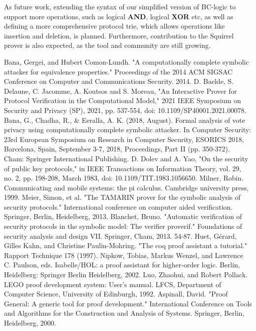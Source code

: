 \documentclass[conference]{IEEEtran}
\begin{document}
As future work, extending the syntax of our simplified version of BC-logic to support more operations, such as logical \textbf{AND}, logical \textbf{XOR} etc, as well as defining a more comprehensive protocol trie, which allows operations like insertion and deletion, is planned. Furthermore, contribution to the Squirrel prover is also expected, as the tool and community are still growing.

\begin{thebibliography}{00}
 Bana, Gergei, and Hubert Comon-Lundh. "A computationally complete symbolic attacker for equivalence properties." Proceedings of the 2014 ACM SIGSAC Conference on Computer and Communications Security. 2014.
 D. Baelde, S. Delaune, C. Jacomme, A. Koutsos and S. Moreau, "An Interactive Prover for Protocol Verification in the Computational Model," 2021 IEEE Symposium on Security and Privacy (SP), 2021, pp. 537-554, doi: 10.1109/SP40001.2021.00078.
 Bana, G., Chadha, R., \& Eeralla, A. K. (2018, August). Formal analysis of vote privacy using computationally complete symbolic attacker. In Computer Security: 23rd European Symposium on Research in Computer Security, ESORICS 2018, Barcelona, Spain, September 3-7, 2018, Proceedings, Part II (pp. 350-372). Cham: Springer International Publishing.
 D. Dolev and A. Yao, "On the security of public key protocols," in IEEE Transactions on Information Theory, vol. 29, no. 2, pp. 198-208, March 1983, doi: 10.1109/TIT.1983.1056650.
 Milner, Robin. Communicating and mobile systems: the pi calculus. Cambridge university press, 1999.
 Meier, Simon, et al. "The TAMARIN prover for the symbolic analysis of security protocols." International conference on computer aided verification. Springer, Berlin, Heidelberg, 2013.
 Blanchet, Bruno. "Automatic verification of security protocols in the symbolic model: The verifier proverif." Foundations of security analysis and design VII. Springer, Cham, 2013. 54-87.
 Huet, Gérard, Gilles Kahn, and Christine Paulin-Mohring. "The coq proof assistant a tutorial." Rapport Technique 178 (1997).
 Nipkow, Tobias, Markus Wenzel, and Lawrence C. Paulson, eds. Isabelle/HOL: a proof assistant for higher-order logic. Berlin, Heidelberg: Springer Berlin Heidelberg, 2002.
 Luo, Zhaohui, and Robert Pollack. LEGO proof development system: User's manual. LFCS, Department of Computer Science, University of Edinburgh, 1992.
 Aspinall, David. "Proof General: A generic tool for proof development." International Conference on Tools and Algorithms for the Construction and Analysis of Systems. Springer, Berlin, Heidelberg, 2000.

\end{thebibliography}
\end{document}
